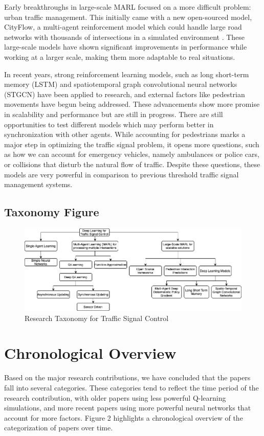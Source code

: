 \documentclass[conference]{IEEEtran}
\begin{document}
Early breakthroughs in large-scale MARL focused on a more difficult problem: urban traffic management. This initially came with a new open-sourced model, CityFlow, a multi-agent reinforcement model which could handle large road networks with thousands of intersections in a simulated environment \cite{7}. These large-scale models have shown significant improvements in performance while working at a larger scale, making them more adaptable to real situations. 

In recent years, strong reinforcement learning models, such as long short-term memory (LSTM) and spatiotemporal graph convolutional neural networks (STGCN) have been applied to research, and external factors like pedestrian movements have begun being addressed. These advancements show more promise in scalability and performance but are still in progress. There are still opportunities to test different models which may perform better in synchronization with other agents. While accounting for pedestrians marks a major step in optimizing the traffic signal problem, it opens more questions, such as how we can account for emergency vehicles, namely ambulances or police cars, or collisions that disturb the natural flow of traffic. Despite these questions, these models are very powerful in comparison to previous threshold traffic signal management systems. 

\subsection{Taxonomy Figure}

\begin{figure}[H]
    \centering
    \includegraphics[width=0.9\linewidth]{Research Taxonomy.png}
    \caption{Research Taxonomy for Traffic Signal Control}
\end{figure}


\section{Chronological Overview}
Based on the major research contributions, we have concluded that the papers fall into several categories. These categories tend to reflect the time period of the research contribution, with older papers using less powerful Q-learning simulations, and more recent papers using more powerful neural networks that account for more factors. Figure 2 highlights a chronological overview of the categorization of papers over time. 
\end{document}
